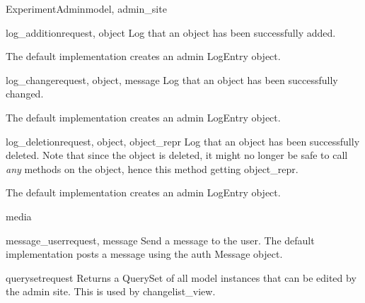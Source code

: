 \documentclass[letterpaper,10pt,english]{sphinxmanual}
\begin{document}
\begin{classdesc}{ExperimentAdmin}{model, admin\_site}
\hypertarget{data.admin.ExperimentAdmin.log_addition}{}\begin{methoddesc}{log\_addition}{request, object}
Log that an object has been successfully added.

The default implementation creates an admin LogEntry object.
\end{methoddesc}

\hypertarget{data.admin.ExperimentAdmin.log_change}{}\begin{methoddesc}{log\_change}{request, object, message}
Log that an object has been successfully changed.

The default implementation creates an admin LogEntry object.
\end{methoddesc}

\hypertarget{data.admin.ExperimentAdmin.log_deletion}{}\begin{methoddesc}{log\_deletion}{request, object, object\_repr}
Log that an object has been successfully deleted. Note that since the
object is deleted, it might no longer be safe to call \emph{any} methods
on the object, hence this method getting object\_repr.

The default implementation creates an admin LogEntry object.
\end{methoddesc}

\hypertarget{data.admin.ExperimentAdmin.media}{}\begin{memberdesc}{media}\end{memberdesc}

\hypertarget{data.admin.ExperimentAdmin.message_user}{}\begin{methoddesc}{message\_user}{request, message}
Send a message to the user. The default implementation
posts a message using the auth Message object.
\end{methoddesc}

\hypertarget{data.admin.ExperimentAdmin.queryset}{}\begin{methoddesc}{queryset}{request}
Returns a QuerySet of all model instances that can be edited by the
admin site. This is used by changelist\_view.
\end{methoddesc}


\end{classdesc}
\end{document}
